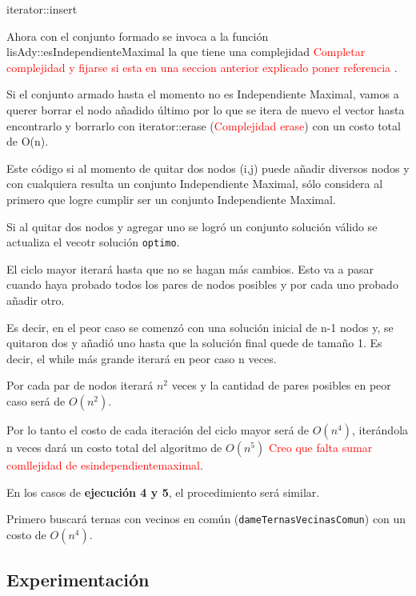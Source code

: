iterator::insert

Ahora con el conjunto formado se invoca a la funci\'on lisAdy::esIndependienteMaximal la que tiene una complejidad \textcolor{red}{Completar complejidad y fijarse si esta en una seccion anterior explicado poner referencia }.

Si el conjunto armado hasta el momento no es Independiente Maximal, vamos a querer borrar el nodo a\~nadido \'ultimo por lo que se itera de nuevo el vector hasta encontrarlo y borrarlo con iterator::erase (\textcolor{red}{Complejidad erase}) con un costo total de O(n).

Este c\'odigo si al momento de quitar dos nodos (i,j) puede a\~nadir diversos nodos y con cualquiera resulta un conjunto Independiente Maximal, s\'olo considera al primero que logre cumplir ser un conjunto Independiente Maximal.

Si al quitar dos nodos y agregar uno se logr\'o un conjunto soluci\'on v\'alido se actualiza el vecotr soluci\'on \texttt{optimo}. 


El ciclo mayor iterar\'a hasta que no se hagan m\'as cambios. Esto va a pasar cuando haya probado todos los pares de nodos posibles y por cada uno probado a\~nadir otro.

Es decir, en el peor caso se comenz\'o con una soluci\'on inicial de n-1 nodos y, se quitaron dos y a\~nadi\'o uno hasta que la soluci\'on final quede de tama\~no 1. Es decir, el while m\'as grande iterar\'a en peor caso n veces.



Por cada par de nodos iterar\'a $n^2$ veces y la cantidad de pares posibles en peor caso ser\'a de $O(n^2)$.


Por lo tanto el costo de cada iteraci\'on del ciclo mayor ser\'a de $O(n^4)$, iter\'andola n veces dar\'a un costo total del algoritmo de $O(n^5)$ \textcolor{red}{Creo que falta sumar comllejidad de esindependientemaximal}. 

\bigskip	

En los casos de \textbf{ejecuci\'on 4 y 5}, el procedimiento ser\'a similar.

Primero buscar\'a ternas con vecinos en com\'un (\texttt{dameTernasVecinasComun}) con un costo de $O(n^4)$. 


\newpage
\subsection{Experimentaci\'on}

